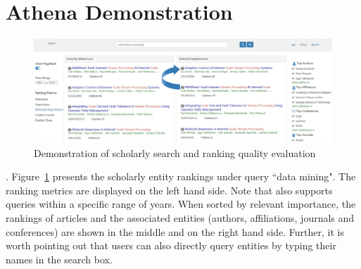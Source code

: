 \section{Athena Demonstration}
\label{sec-demo}

\begin{figure}[tp]
\centering
\includegraphics[width=\textwidth]{searchKeywords3.pdf}
\vspace{-3.5ex}
\caption{Demonstration of scholarly search and ranking quality evaluation}
\label{fig:searchKeywords}
\vspace{-2ex}
\end{figure}




.
Figure~\ref{fig:searchKeywords} presents the scholarly entity rankings under query ``data mining".
The ranking metrics are displayed on the left hand side. Note that \oursystem also supports queries within a specific range of years.
When sorted by relevant importance, the rankings of articles and the associated entities (authors, affiliations, journals and conferences) are shown in the middle and on the right hand side.
Further, it is worth pointing out that users can also directly query entities by typing their names in the search box. %




